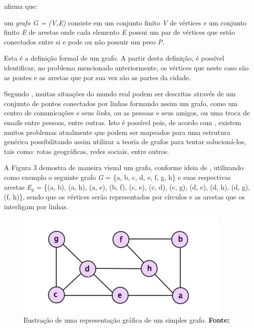 \par {} afirma que: 

\begin{citacao}
	um \textit{grafo G = (V,E)} consiste em um conjunto finito \textit{V} de vértices e um conjunto finito \textit{E} de arestas onde cada elemento \textit{E} possui um par de vértices que estão conectados entre si e pode ou não possuir um peso \textit{P}.
\end{citacao}

\par Esta é a definição formal de um grafo. A partir desta definição, é possível identificar, no problema mencionado anteriormente, os vértices que neste caso são as pontes e as arestas que por sua vez são as partes da cidade.

\par Segundo , muitas situações do mundo real podem ser descritas através de um conjunto de pontos conectados por linhas formando assim um grafo, como um centro de comunicações e seus \textit{links}, ou as pessoas e seus amigos, ou uma troca de emails entre pessoas, entre outras. Isto é possível pois, de acordo com , existem muitos problemas atualmente que podem ser mapeados para uma estrutura genérica possibilitando assim utilizar a teoria de grafos para tentar solucioná-los, tais como: rotas geográficas, redes sociais, entre outros.

\par A Figura 3 demostra de maneira visual um grafo, conforme ideia de , utilizando como exemplo o seguinte grafo \textit{G} = \{a, b, c, d, e, f, g, h\} e suas respectivas arestas \textit{E}$_g$ = \{(a, b), (a, h), (a, e), (b, f), (c, e), (c, d), (c, g), (d, e), (d, h), (d, g), (f, h)\}, sendo que os vértices serão representados por círculos e as arestas que os interligam por linhas.


\begin{figure}[h!]
	\centerline{\includegraphics[scale=0.77]{./imagens/simple_graph.png}}
	\caption[Ilustração de uma representação gráfica de um simples grafo]
	{Ilustração de uma representação gráfica de um simples grafo. \textbf{Fonte:} }
	\label{fig:exemplo1}
\end{figure}

